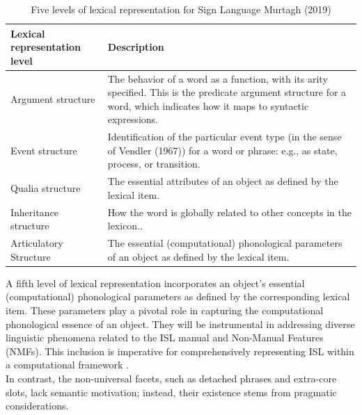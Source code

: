 \begin{table}[H]
    \centering
    \begin{tabular}{|p{4cm}|p{7cm}|} \hline 
         Lexical representation level& Description\\ \hline 
         Argument structure& The behavior of a word as a function, with
its arity specified. This is the predicate
argument structure for a word, which
indicates how it maps to syntactic
expressions.\\ \hline 
         Event structure& Identification of the particular event type
(in the sense of Vendler (1967)) for a
word or phrase: e.g., as state, process, or
transition.\\ \hline 
         Qualia structure& The essential attributes of an object as
defined by the lexical item.\\ \hline 
         Inheritance structure& How the word is globally related to other
concepts in the lexicon..\\ \hline
 Articulatory Structure&The essential (computational) phonological
parameters of an object as defined by the lexical
item.\\\hline
    \end{tabular}
    \caption{Five levels of lexical representation for Sign Language Murtagh (2019)}
    \label{tab:my_label}
\end{table}


A fifth level of lexical representation incorporates an object's essential (computational) phonological parameters as defined by the corresponding lexical item. These parameters play a pivotal role in capturing the computational phonological essence of an object. They will be instrumental in addressing diverse linguistic phenomena related to the ISL manual and Non-Manual Features (NMFs). This inclusion is imperative for comprehensively representing ISL within a computational framework \parencite{murtagh-etal-2022-sign}. \\


In contrast, the non-universal facets, such as detached phrases and extra-core slots, lack semantic motivation; instead, their existence stems from pragmatic considerations.

